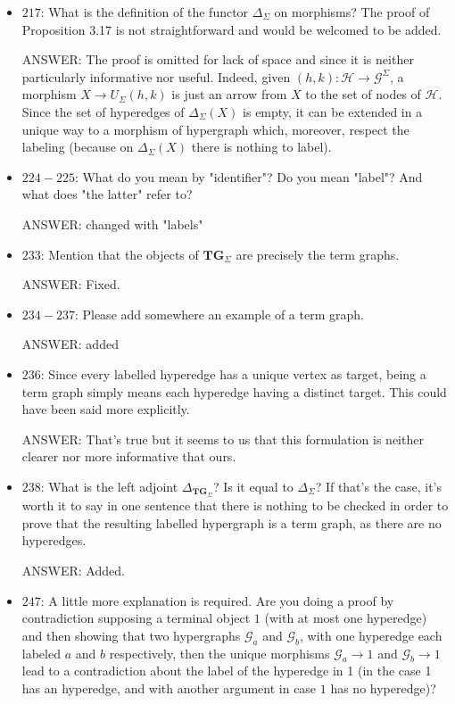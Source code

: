\documentclass[english,11pt,a4paper]{article}
\begin{document}
\begin{itemize}
\item $217$: What is the definition of the functor $\Delta_\Sigma$ on morphisms? The proof of Proposition 3.17 is not straightforward and would be welcomed to be added.

ANSWER: The proof is omitted for lack of space and since it is neither particularly informative nor useful. Indeed, given $(h,k)\colon \mathcal{H}\to \mathcal{G}^\Sigma$,  a morphism $X\to U_{\Sigma}(h,k)$ is just an arrow from $X$ to the set of nodes of $\mathcal{H}$. Since the set of hyperedges of $\Delta_{\Sigma}(X)$ is empty, it can be extended in a unique way to a morphism of hypergraph which, moreover, respect the labeling (because on $\Delta_{\Sigma}(X)$ there is nothing to label).

\item $224-225$: What do you mean by "identifier"? Do you mean "label"? And what does "the latter" refer to? 

ANSWER: changed with "labels"

\item $233$: Mention that the objects of $\mathbf{TG}_\Sigma$ are precisely the term graphs.

ANSWER: Fixed.

\item $234-237$: Please add somewhere an example of a term graph.

ANSWER: added

\item $236$: Since every labelled hyperedge has a unique vertex as target, being a term graph simply means each hyperedge having a distinct target. This could have been said more explicitly.

ANSWER: That's true but it seems to us that this formulation is neither clearer nor more informative that ours.

\item $238$: What is the left adjoint $\Delta_{\mathbf{TG}_\Sigma}$? Is it equal to $\Delta_{\Sigma}$? If that's the case, it's worth it to say in one sentence that there is nothing to be checked in order to prove that the resulting labelled hypergraph is a term graph, as there are no hyperedges.

ANSWER: Added.

\item $247$: A little more explanation is required. Are you doing a proof by contradiction supposing a terminal object $1$ (with at most one hyperedge) and then showing that two hypergraphs $\mathcal{G}_a$ and $\mathcal{G}_b$, with one hyperedge each labeled $a$ and $b$ respectively, then the unique morphisms $\mathcal{G}_a \to 1$ and $\mathcal{G}_b \to 1$ lead to a contradiction about the label of the hyperedge in 1 (in the case 1 has an hyperedge, and with another argument in case $1$ has no hyperedge)? 


\end{itemize}
\end{document}
